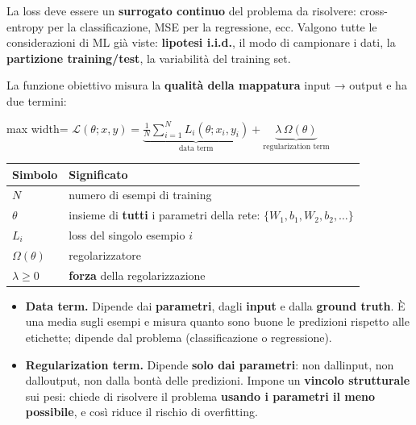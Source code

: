 \documentclass[11pt,a4paper,oneside,openany]{book}
\providecommand{\tightlist}{\setlength{\itemsep}{0pt}\setlength{\parskip}{0pt}}
\begin{document}
La loss deve essere un \textbf{surrogato continuo} del problema da risolvere: cross-entropy per la classificazione, MSE per la regressione, ecc. Valgono tutte le considerazioni di ML già viste: \textbf{l\textquotesingle ipotesi i.i.d.}, il modo di campionare i dati, la \textbf{partizione training/test}, la variabilità del training set.

La funzione obiettivo misura la \textbf{qualità della mappatura} input → output e ha due termini:

\begin{center}
\begin{adjustbox}{max width=\linewidth}
$\displaystyle 
\boxed{\mathcal{L}(\theta; x, y) = \underbrace{\frac{1}{N}\sum_{i=1}^{N} L_i(\theta; x_i, y_i)}_{\text{data term}} + \underbrace{\lambda\,\Omega(\theta)}_{\text{regularization term}}}
$
\end{adjustbox}
\end{center}

\begin{longtable}[]{@{}
  >{\raggedright\arraybackslash}p{}
  >{\raggedright\arraybackslash}p{}@{}}
\toprule\noalign{}
\begin{minipage}[b]{\linewidth}\raggedright
Simbolo
\end{minipage} & \begin{minipage}[b]{\linewidth}\raggedright
Significato
\end{minipage} \\
\midrule\noalign{}
\endhead
\bottomrule\noalign{}
\endlastfoot
\(N\) & numero di esempi di training \\
\(\theta\) & insieme di \textbf{tutti} i parametri della rete: \(\{W_1, b_1, W_2, b_2, \dots\}\) \\
\(L_i\) & loss del singolo esempio \(i\) \\
\(\Omega(\theta)\) & regolarizzatore \\
\(\lambda \ge 0\) & \textbf{forza} della regolarizzazione \\
\end{longtable}

\begin{itemize}
\tightlist
\item
  \textbf{Data term.} Dipende dai \textbf{parametri}, dagli \textbf{input} e dalla \textbf{ground truth}. È una media sugli esempi e misura quanto sono buone le predizioni rispetto alle etichette; dipende dal problema (classificazione o regressione).
\item
  \textbf{Regularization term.} Dipende \textbf{solo dai parametri}: non dall\textquotesingle input, non dall\textquotesingle output, non dalla bontà delle predizioni. Impone un \textbf{vincolo strutturale} sui pesi: chiede di risolvere il problema \textbf{usando i parametri il meno possibile}, e così riduce il rischio di overfitting.
\end{itemize}
\end{document}

